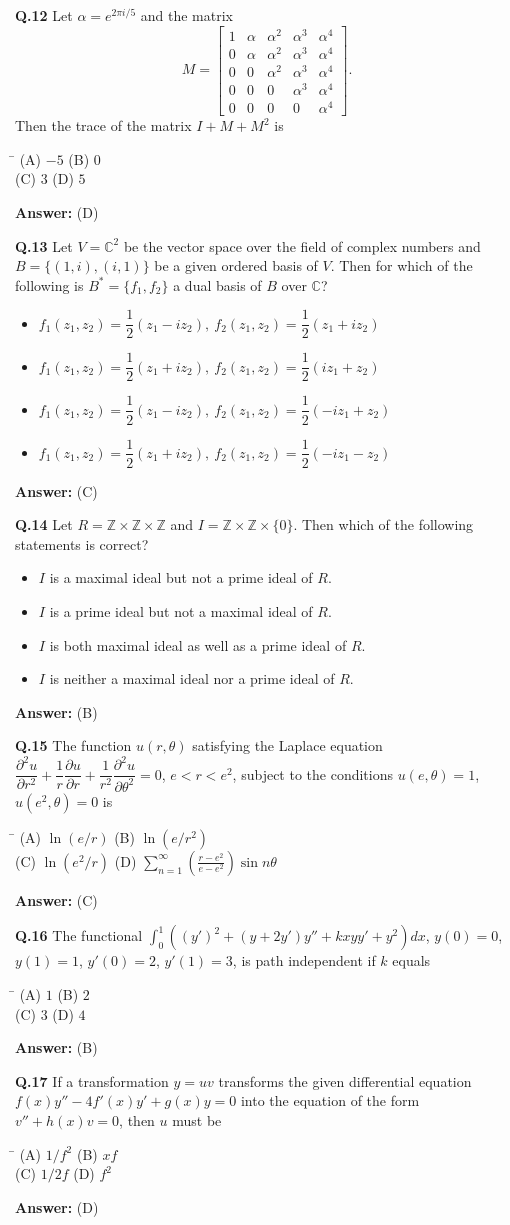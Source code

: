 \documentclass[11pt,a4paper]{article}
\newcommand{\optsfourA}[4]{%
  \begin{tabbing}
    \hspace{0.48\linewidth}\=\kill
    (A) #1 \> (B) #2 \\[2pt]
    (C) #3 \> (D) #4
  \end{tabbing}%
}
\newcommand{\optslistA}[4]{%
  \begin{itemize}
    \setlength{\itemsep}{2pt}\setlength{\parskip}{0pt}
    \item[(A)] #1
    \item[(B)] #2
    \item[(C)] #3
    \item[(D)] #4
  \end{itemize}%
}
\newcommand{\ans}[1]{\textbf{Answer:} #1\par\medskip}
\begin{document}
\textbf{Q.12} Let $\alpha = e^{2\pi i/5}$ and the matrix
\[
  M = \begin{bmatrix}
    1 & \alpha & \alpha^2 & \alpha^3 & \alpha^4 \\
    0 & \alpha & \alpha^2 & \alpha^3 & \alpha^4 \\
    0 & 0 & \alpha^2 & \alpha^3 & \alpha^4 \\
    0 & 0 & 0 & \alpha^3 & \alpha^4 \\
    0 & 0 & 0 & 0 & \alpha^4
  \end{bmatrix}.
\]
Then the trace of the matrix $I + M + M^2$ is
\optsfourA{$-5$}{$0$}{$3$}{$5$}
\ans{(D)}

\textbf{Q.13} Let $V = \mathbb{C}^2$ be the vector space over the field of complex numbers and $B = \{(1, i), (i, 1)\}$ be a given ordered basis of $V$. Then for which of the following is $B^* = \{f_1, f_2\}$ a dual basis of $B$ over $\mathbb{C}$?
\optslistA{$f_1(z_1, z_2) = \dfrac{1}{2}(z_1 - i z_2),\ f_2(z_1, z_2) = \dfrac{1}{2}(z_1 + i z_2)$}{$f_1(z_1, z_2) = \dfrac{1}{2}(z_1 + i z_2),\ f_2(z_1, z_2) = \dfrac{1}{2}(i z_1 + z_2)$}{$f_1(z_1, z_2) = \dfrac{1}{2}(z_1 - i z_2),\ f_2(z_1, z_2) = \dfrac{1}{2}(-i z_1 + z_2)$}{$f_1(z_1, z_2) = \dfrac{1}{2}(z_1 + i z_2),\ f_2(z_1, z_2) = \dfrac{1}{2}(-i z_1 - z_2)$}
\ans{(C)}

\textbf{Q.14} Let $R = \mathbb{Z} \times \mathbb{Z} \times \mathbb{Z}$ and $I = \mathbb{Z} \times \mathbb{Z} \times \{0\}$. Then which of the following statements is correct?
\optslistA{$I$ is a maximal ideal but not a prime ideal of $R$.}{$I$ is a prime ideal but not a maximal ideal of $R$.}{$I$ is both maximal ideal as well as a prime ideal of $R$.}{$I$ is neither a maximal ideal nor a prime ideal of $R$.}
\ans{(B)}

\textbf{Q.15} The function $u(r, \theta)$ satisfying the Laplace equation $\dfrac{\partial^2 u}{\partial r^2} + \dfrac{1}{r}\dfrac{\partial u}{\partial r} + \dfrac{1}{r^2}\dfrac{\partial^2 u}{\partial \theta^2} = 0$, $e < r < e^2$, subject to the conditions $u(e, \theta) = 1$, $u(e^2, \theta) = 0$ is
\optsfourA{$\ln(e/r)$}{$\ln(e/r^2)$}{$\ln(e^2/r)$}{$\displaystyle\sum_{n=1}^{\infty} \left(\frac{r - e^2}{e - e^2}\right)\sin n\theta$}
\ans{(C)}

\textbf{Q.16} The functional $\displaystyle\int_0^1 \left((y')^2 + (y + 2y')y'' + k x y y' + y^2\right)dx$, $y(0) = 0$, $y(1) = 1$, $y'(0) = 2$, $y'(1) = 3$, is path independent if $k$ equals
\optsfourA{$1$}{$2$}{$3$}{$4$}
\ans{(B)}

\textbf{Q.17} If a transformation $y = uv$ transforms the given differential equation $f(x)y'' - 4f'(x)y' + g(x)y = 0$ into the equation of the form $v'' + h(x)v = 0$, then $u$ must be
\optsfourA{$1/f^2$}{$xf$}{$1/2f$}{$f^2$}
\ans{(D)}
\end{document}
